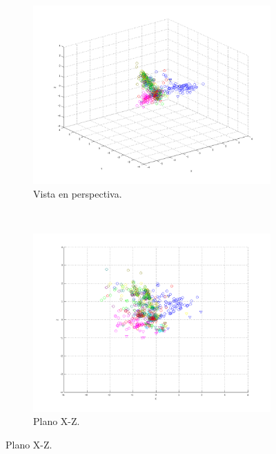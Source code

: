 \documentclass[informe.tex]{subfiles}
\begin{document}
      
	\begin{figure}[H]
        \centering
        \hspace*{-6.5cm}
        \begin{subfigure}[b]{0.49\textwidth}
                \includegraphics[width=\textwidth]{graficos/fold4_criterioParadao_reglaM_alpha0_rep3_0P.png}
                \caption{Vista en perspectiva.}
        \end{subfigure}%
        ~
        \begin{subfigure}[b]{0.49\textwidth}
                \includegraphics[width=\textwidth]{graficos/fold4_criterioParadao_reglaM_alpha0_rep3_1XZ.png}
                \caption{Plano X-Z.}
        \end{subfigure}
        

\end{figure}
\end{document}
